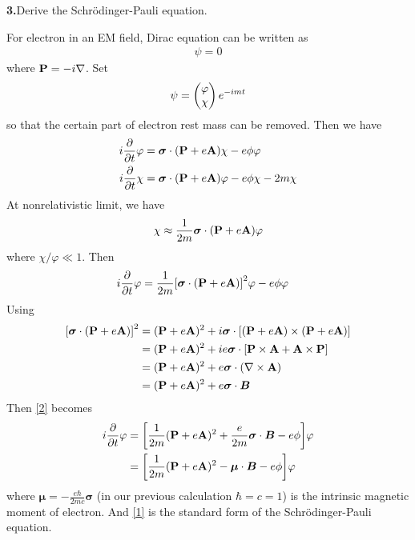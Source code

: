 \documentclass{article}
\newcommand{\bm}[1]{\boldsymbol{#1}}
\newcommand{\bP}{\vb{P}}
\newcommand{\bA}{\vb{A}}
\newcommand{\ba}{\boldsymbol{\alpha}}
\begin{document}
{\bf3.}\quad Derive the Schr\"odinger-Pauli equation.

For electron in an EM field, Dirac equation can be written as
\begin{align}
  [i\pdv{t}+e\phi-\ba\cdot(\bP+e\bA)-m\beta]\psi=0
\end{align}
where $\bP=-i\nabla$.
Set
\begin{align*}
  \psi=\pmqty{\varphi\\\chi}e^{-imt}
\end{align*}
so that the certain part of electron rest mass can be removed. Then we have
\begin{align*}
  i\pdv{t}\varphi&=\bm{\sigma}\cdot(\bP+e\bA)\chi-e\phi\varphi\\
  i\pdv{t}\chi&=\bm{\sigma}\cdot(\bP+e\bA)\varphi-e\phi\chi-2m\chi\\
\end{align*}
At nonrelativistic limit, we have
\begin{align}\label{2}
  \chi\approx\frac{1}{2m}\bm{\sigma}\cdot(\bP+e\bA)\varphi
\end{align}
where $\chi/\varphi\ll1$. Then
\begin{align*}
  i\pdv{t}\varphi&=\frac{1}{2m}\bqty{\bm{\sigma}\cdot(\bP+e\bA)}^2\varphi-e\phi\varphi
\end{align*}
Using
\begin{align*}
  \bqty{\bm{\sigma}\cdot(\bP+e\bA)}^2&=(\bP+e\bA)^2+i\bm{\sigma}\cdot\bqty{(\bP+e\bA)\times(\bP+e\bA)}\\
  &=(\bP+e\bA)^2+ie\bm{\sigma}\cdot\bqty{\bP\times\bA+\bA\times\bP}\\
  &=(\bP+e\bA)^2+e\bm{\sigma}\cdot(\nabla\times\bA)\\
  &=(\bP+e\bA)^2+e\bm{\sigma}\cdot\bm{B}
\end{align*}
Then \eqref{2} becomes
\begin{align}{\label{1}}
  i\pdv{t}\varphi&=\bqty{\frac{1}{2m}(\bP+e\bA)^2+\frac{e}{2m}\bm{\sigma}\cdot\bm{B}-e\phi}\varphi\\
  &=\bqty{\frac{1}{2m}(\bP+e\bA)^2-\bm{\mu}\cdot\bm{B}-e\phi}\varphi
\end{align}
where $\bm{\mu}=-\frac{e\hbar}{2mc}\bm{\sigma}$ (in our previous calculation $\hbar=c=1$) is the intrinsic magnetic moment of electron. And \eqref{1} is the standard form of the Schr\"odinger-Pauli equation.
\end{document}
